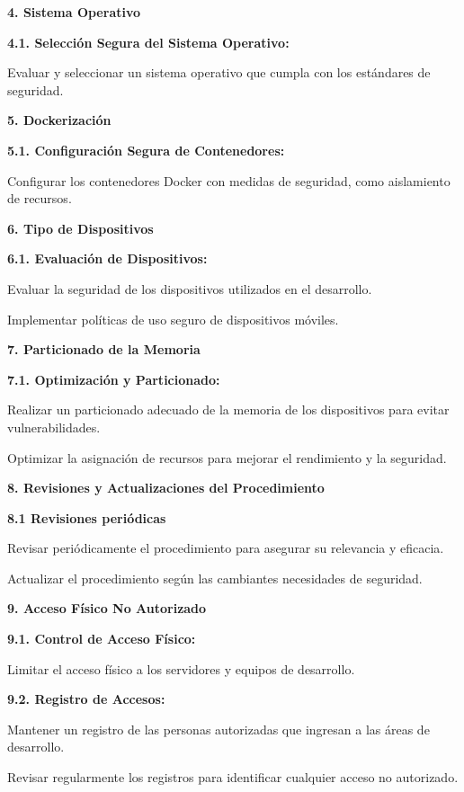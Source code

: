 \textbf{4. Sistema Operativo}

\textbf{4.1. Selección Segura del Sistema Operativo:}

Evaluar y seleccionar un sistema operativo que cumpla con los estándares de seguridad.

\textbf{5. Dockerización}

\textbf{5.1. Configuración Segura de Contenedores:}

Configurar los contenedores Docker con medidas de seguridad, como aislamiento de recursos.

\textbf{6. Tipo de Dispositivos}

\textbf{6.1. Evaluación de Dispositivos:}

Evaluar la seguridad de los dispositivos utilizados en el desarrollo.

Implementar políticas de uso seguro de dispositivos móviles.

\textbf{7. Particionado de la Memoria}

\textbf{7.1. Optimización y Particionado:}

Realizar un particionado adecuado de la memoria de los dispositivos para evitar vulnerabilidades.

Optimizar la asignación de recursos para mejorar el rendimiento y la seguridad.

\textbf{8. Revisiones y Actualizaciones del Procedimiento}

\textbf{8.1 Revisiones periódicas}

Revisar periódicamente el procedimiento para asegurar su relevancia y eficacia.

Actualizar el procedimiento según las cambiantes necesidades de seguridad.

\textbf{9. Acceso Físico No Autorizado}

\textbf{9.1. Control de Acceso Físico:}

Limitar el acceso físico a los servidores y equipos de desarrollo.

\textbf{9.2. Registro de Accesos:}

Mantener un registro de las personas autorizadas que ingresan a las áreas de desarrollo.

Revisar regularmente los registros para identificar cualquier acceso no autorizado.
